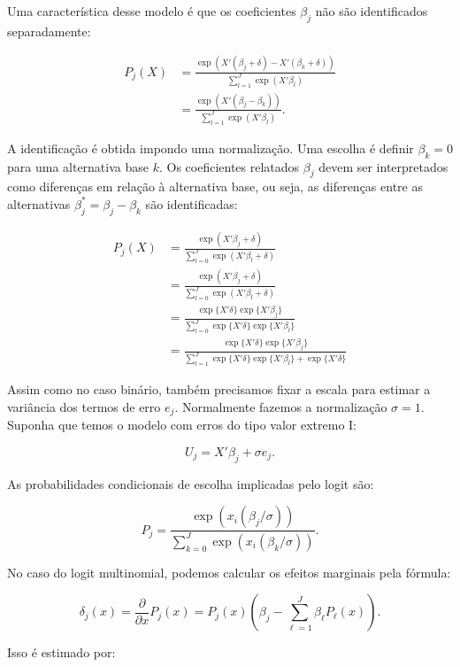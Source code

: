 \documentclass[12pt]{article}
\theoremstyle{break}
\begin{document}
Uma característica desse modelo é que os coeficientes \( {\beta}_j \) não são identificados separadamente:

\begin{align*}
   P_j({X})  &= \frac{\exp\left( {X}' ({\beta}_j+ \delta) - {X}'({\beta}_k +\delta) \right)}{\sum_{l=1}^{J} \exp\left( {X}' {\beta}_l \right)} \\
   &= \frac{\exp\left( {X}' ({\beta}_j - {\beta}_k) \right)}{\sum_{l=1}^{J} \exp\left( {X}' {\beta}_l \right)}.
\end{align*}

A identificação é obtida impondo uma normalização. Uma escolha é definir \( {\beta}_k = 0 \) para uma alternativa base \( k \). Os coeficientes relatados \( {\beta}_j \) devem ser interpretados como diferenças em relação à alternativa base, ou seja, as diferenças entre as alternativas \( {\beta}_j^* = {\beta}_j - {\beta}_k \) são identificadas:

\begin{align*}
    P_j(X) &= \frac{\exp(X'\beta_j + \delta)}{\sum_{l=0}^J \exp(X'\beta_l + \delta)} \\
&= \frac{\exp(X'\beta_j + \delta)}{\sum_{l=0}^J \exp(X'\beta_l + \delta)} \\
&= \frac{\exp\{X'\delta\} \exp\{X'\beta_j\}}{\sum_{l=0}^J \exp\{X'\delta\} \exp\{X'\beta_l\}} \\
&= \frac{\exp\{X'\delta\} \exp\{X'\beta_j\}}{\sum_{l=1}^J \exp\{X'\delta\} \exp\{X'\beta_l\} + \exp\{X'\delta\}}
\end{align*}

Assim como no caso binário, também precisamos fixar a escala para estimar a variância dos termos de erro \( e_{j} \). Normalmente fazemos a normalização \( \sigma = 1 \). Suponha que temos o modelo com erros do tipo valor extremo I:

\[
U_{j} = {X}' {\beta}_j + \sigma e_{j}.
\]

As probabilidades condicionais de escolha implicadas pelo logit são:

\[
P_{j} = \frac{\exp\left( x_i ({\beta}_j / {\sigma}) \right)}{\sum_{k=0}^{J} \exp\left( x_i ({\beta}_k / {\sigma}) \right)}.
\]

No caso do logit multinomial, podemos calcular os efeitos marginais pela fórmula:

\[
\delta_j(x) = \frac{\partial}{\partial x} P_j(x) = P_j(x) \left( {\beta}_j - \sum_{\ell=1}^{J} {\beta}_\ell P_\ell(x) \right).
\]

Isso é estimado por:
\end{document}
